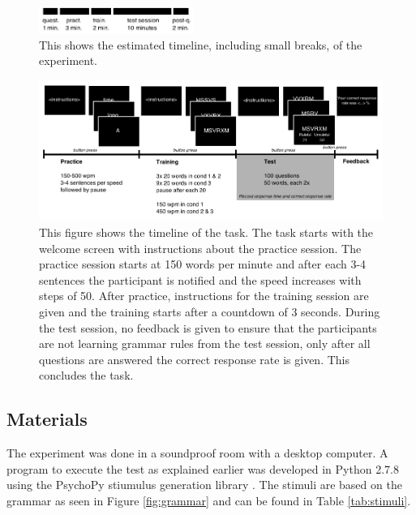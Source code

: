 \begin{figure}[h]
	\centering
	\includegraphics[width=0.45\textwidth]{media/timeline-experiment}
	\caption{This shows the estimated timeline, including small breaks, of the experiment.}
	\label{fig:timeline}
\end{figure}


\begin{figure}[h]
	\centering
	\includegraphics[width=\textwidth]{media/tasktimeline}
	\caption{This figure shows the timeline of the task. The task starts with the welcome screen with instructions about the practice session. The practice session starts at 150 words per minute and after each 3-4 sentences the participant is notified and the speed increases with steps of 50. After practice, instructions for the training session are given and the training starts after a countdown of 3 seconds. During the test session, no feedback is given to ensure that the participants are not learning grammar rules from the test session, only after all questions are answered the correct response rate is given. This concludes the task.}
	\label{fig:tasktimeline}
\end{figure}

\subsection{Materials}
The experiment was done in a soundproof room with a desktop computer.
A program to execute the test as explained earlier was developed in
Python 2.7.8 using the PsychoPy stiumulus generation library
\citep{peirce2008generating}. The stimuli are based on the grammar as
seen in Figure \ref{fig:grammar} and can be found in Table
\ref{tab:stimuli}.

